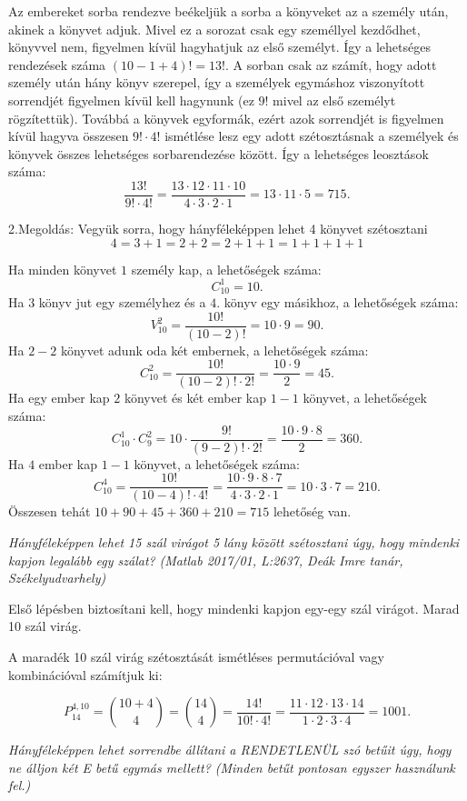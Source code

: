 \begin{solution}
Az embereket sorba rendezve beékeljük a sorba a könyveket
az a személy után, akinek a könyvet adjuk. Mivel ez a sorozat csak
egy személlyel kezdődhet, könyvvel nem, figyelmen kívül hagyhatjuk
az első személyt. Így a lehetséges rendezések száma $(10-1+4)!=13!$.
A sorban csak az számít, hogy adott személy után hány könyv szerepel,
így a személyek egymáshoz viszonyított sorrendjét figyelmen kívül
kell hagynunk (ez $9!$ mivel az első személyt rögzítettük). Továbbá
a könyvek egyformák, ezért azok sorrendjét is figyelmen kívül hagyva
összesen $9!\cdot4!$ ismétlése lesz egy adott szétosztásnak a személyek
és könyvek összes lehetséges sorbarendezése között. Így a lehetséges
leosztások száma: 
\[
\frac{13!}{9!\cdot4!}=\frac{13\cdot12\cdot11\cdot10}{4\cdot3\cdot2\cdot1}=13\cdot11\cdot5=715.
\]

2.Megoldás: Vegyük sorra, hogy hányféleképpen lehet 4 könyvet szétosztani
\[
4=3+1=2+2=2+1+1=1+1+1+1
\]

Ha minden könyvet $1$ személy kap, a lehetőségek száma: 
\[
C_{10}^{1}=10.
\]
Ha $3$ könyv jut egy személyhez és a $4.$ könyv egy másikhoz, a
lehetőségek száma: 
\[
V_{10}^{2}=\frac{10!}{(10-2)!}=10\cdot9=90.
\]
Ha $2-2$ könyvet adunk oda két embernek, a lehetőségek száma: 
\[
C_{10}^{2}=\frac{10!}{(10-2)!\cdot2!}=\frac{10\cdot9}{2}=45.
\]
Ha egy ember kap $2$ könyvet és két ember kap $1-1$ könyvet, a lehetőségek
száma: 
\[
C_{10}^{1}\cdot C_{9}^{2}=10\cdot\frac{9!}{(9-2)!\cdot2!}=\frac{10\cdot9\cdot8}{2}=360.
\]
Ha $4$ ember kap $1-1$ könyvet, a lehetőségek száma: 
\[
C_{10}^{4}=\frac{10!}{(10-4)!\cdot4!}=\frac{10\cdot9\cdot8\cdot7}{4\cdot3\cdot2\cdot1}=10\cdot3\cdot7=210.
\]
Összesen tehát $10+90+45+360+210=715$ lehetőség van. 
\end{solution}
\begin{extraproblem}
\textit{\emph{Hányféleképpen lehet 15 szál virágot 5 lány között
szétosztani úgy, hogy mindenki kapjon legalább egy szálat? }}\textit{(Matlab
2017/01, L:2637, Deák Imre tanár, Székelyudvarhely)}
\end{extraproblem}

\begin{solution}
Első lépésben biztosítani kell, hogy mindenki kapjon egy-egy szál
virágot. Marad 10 szál virág.

A maradék 10 szál virág szétosztását ismétléses permutációval vagy
kombinációval számítjuk ki:

\[
P_{14}^{4,10}=\binom{10+4}{4}=\binom{14}{4}=\frac{14!}{10!\cdot4!}=\frac{11\cdot12\cdot13\cdot14}{1\cdot2\cdot3\cdot4}=1001.
\]
\end{solution}
\begin{extraproblem}
\textit{\emph{Hányféleképpen lehet sorrendbe állítani a RENDETLENÜL
szó betűit úgy, hogy ne álljon két E betű egymás mellett? (Minden
betűt pontosan egyszer használunk fel.)}}
\end{extraproblem}

